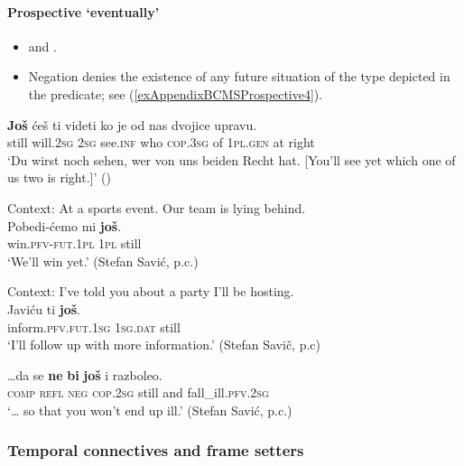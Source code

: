 \paragraph{Prospective \lq eventually\rq{}}
\label{appendixBCMSProspective}
\begin{itemize}
	\item \textcite[142]{Koenig1991} and \textcite{Prajnkovic2018}.
	\item Negation denies the existence of any future situation of the type depicted in the predicate; see (\ref{exAppendixBCMSProspective4}).
\end{itemize}
\begin{exe}
	\ex
	\gll \textbf{Još} ćeš ti videti ko je od nas dvojice upravu.\\
	still will.2\textsc{sg} 2\textsc{sg} see.\textsc{inf} who \textsc{cop}.3\textsc{sg} of 1\textsc{pl}.\textsc{gen} at right\\
	\glt \lq Du wirst noch sehen, wer von uns beiden Recht hat. [You'll see yet which one of us two is right.]' (\cite[244]{JDahl1988})

	\ex Context: At a sports event. Our team is lying behind.\\
	\gll Pobedi-ćemo mi \textbf{još}.\\
	win.\textsc{pfv}-\textsc{fut}.1\textsc{pl} 1\textsc{pl} still\\
	\glt \lq We'll win yet.\rq{ }(Stefan Savić, p.c.)

	\ex Context: I've told you about a party I'll be hosting.\\
	\gll Javiću ti \textbf{još}.\\
	inform.\textsc{pfv}.\textsc{fut}.1\textsc{sg} 1\textsc{sg}.\textsc{dat} still\\
	\glt \lq I'll follow up with more information.' (Stefan Savič, p.c)
	
	\ex\label{exAppendixBCMSProspective4}
	\gll …da se \textbf{ne} \textbf{bi} \textbf{još} i razboleo.\\
	\phantom{…}\textsc{comp} \textsc{refl} \textsc{neg} \textsc{cop}.2\textsc{sg} still and fall\_ill.\textsc{pfv}.2\textsc{sg}\\
	\glt \lq … so that you won't end up ill.\rq{ }(Stefan Savić, p.c.)
\end{exe}



\subsubsection{Temporal connectives and frame setters}

